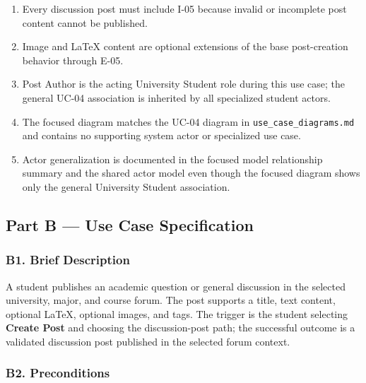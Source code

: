 \documentclass[12pt]{article}
\begin{document}
\begin{enumerate}
\item Every discussion post must include I-05 because invalid or incomplete post content cannot be published.
\item Image and LaTeX content are optional extensions of the base post-creation behavior through E-05.
\item Post Author is the acting University Student role during this use case; the general UC-04 association is inherited by all specialized student actors.
\item The focused diagram matches the UC-04 diagram in \texttt{use\_case\_diagrams.md} and contains no supporting system actor or specialized use case.
\item Actor generalization is documented in the focused model relationship summary and the shared actor model even though the focused diagram shows only the general University Student association.
\end{enumerate}
\par\medskip

\hypertarget{sec:part-b-use-case-specification}{}
\subsection*{Part B --- Use Case Specification}
\par\medskip

\hypertarget{sec:b1-brief-description}{}
\subsubsection*{B1. Brief Description}
\par\medskip

A student publishes an academic question or general discussion in the selected university, major, and course forum. The post supports a title, text content, optional LaTeX, optional images, and tags. The trigger is the student selecting \textbf{Create Post} and choosing the discussion-post path; the successful outcome is a validated discussion post published in the selected forum context.
\par\medskip

\hypertarget{sec:b2-preconditions}{}
\subsubsection*{B2. Preconditions}
\par\medskip
\end{document}
